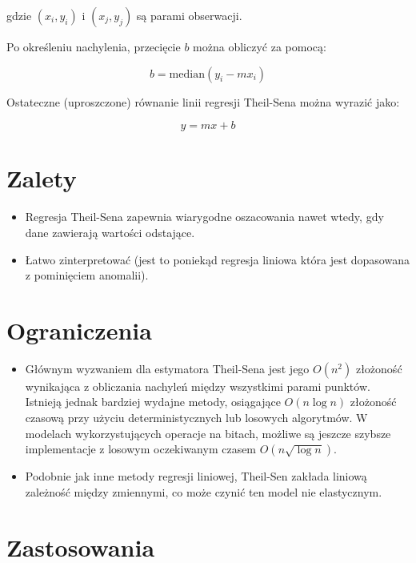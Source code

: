 gdzie $(x_i, y_i)$ i $(x_j, y_j)$ są parami obserwacji.

Po określeniu nachylenia, przecięcie $b$ można obliczyć za pomocą:

$$
b = \text{median}(y_i - m x_i)
$$

Ostateczne (uproszczone) równanie linii regresji Theil-Sena można wyrazić jako:

$$
y = mx + b
$$

{}
\section*{Zalety }
\vspace{-1.0em}


\begin{itemize}


\item Regresja Theil-Sena zapewnia wiarygodne oszacowania nawet wtedy, gdy dane zawierają wartości odstające.
\item Łatwo zinterpretować (jest to poniekąd regresja liniowa która jest dopasowana z pominięciem anomalii).
\end{itemize}

{}
\section*{Ograniczenia \cite{Blunck2006, cole1989optimal, Chan2010}}
\vspace{-1.0em}

\begin{itemize}

\item Głównym wyzwaniem dla estymatora Theil-Sena jest jego $O(n^2)$ złożoność wynikająca z obliczania nachyleń między wszystkimi parami punktów. Istnieją jednak bardziej wydajne metody, osiągające $O(n \log n)$ złożoność czasową przy użyciu deterministycznych lub losowych algorytmów. W modelach wykorzystujących operacje na bitach,  możliwe są jeszcze szybsze implementacje z losowym oczekiwanym czasem $O(n \sqrt {\log n})$.

\item Podobnie jak inne metody regresji liniowej, Theil-Sen zakłada liniową zależność między zmiennymi, co może czynić ten model nie elastycznym.
\end{itemize}

{}
\section*{Zastosowania \cite{Fernandes2005, hirsch1982techniques, vaidyanathan2005comprehensive, akritas1995theil, romanic2014long} }
\vspace{-1.0em}

